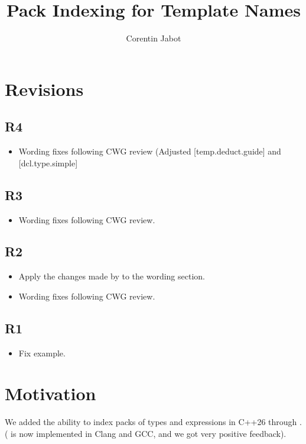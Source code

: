 \documentclass{wg21}
\title{Pack Indexing for Template Names}
\author{Corentin Jabot}{corentin.jabot@gmail.com}
\begin{document}
\maketitle

\section{Revisions}


\subsection{R4}

\begin{itemize}
\item Wording fixes following CWG review (Adjusted [temp.deduct.guide] and [dcl.type.simple]
\end{itemize}


\subsection{R3}

\begin{itemize}
\item Wording fixes following CWG review.
\end{itemize}

\subsection{R2}

\begin{itemize}
\item Apply the changes made by  to the wording section.
\item Wording fixes following CWG review.
\end{itemize}

\subsection{R1}

\begin{itemize}
\item Fix example.
\end{itemize}

\section{Motivation}

We added the ability to index packs of types and expressions in C++26 through .
( is now implemented in Clang and GCC, and we got very positive feedback).
\end{document}

